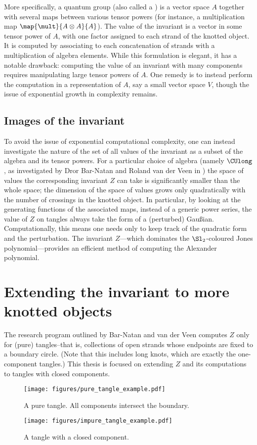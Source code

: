More specifically, a quantum group (also called a ) is a
vector space $A$ together with several maps between various tensor powers (for
instance, a multiplication map $\map {\mult} {A \otimes A} {A}$). The value of
the invariant is a vector in some tensor power of $A$, with one factor assigned
to each strand of the knotted object. It is computed by associating to each
concatenation of strands with a multiplication of algebra elements. While this
formulation is elegant, it has a notable drawback: computing the value of an
invariant with many components requires manipulating large tensor powers of $A$.
One remedy is to instead perform the computation in a representation of $A$, say
a small vector space $V$, though the issue of exponential growth in complexity
remains.

\subsection{Images of the invariant}
To avoid the issue of exponential computational complexity, one can instead
investigate the nature of the set of all values of the invariant as a subset of
the algebra and its tensor powers. For a particular choice of algebra (namely
$\CUlong$, as investigated by Dror Bar-Natan and Roland van der Veen in
\cite{BV}) the space of values the corresponding invariant $Z$ can take is
significantly smaller than the whole space; the dimension of the space of values
grows only quadratically with the number of crossings in the knotted object. In
particular, by looking at the generating functions of the associated maps,
instead of a generic power series, the value of $Z$ on tangles always take the
form of a (perturbed) Gaußian. Computationally, this means one needs only to
keep track of the quadratic form and the perturbation. The invariant $Z$---which
dominates the $\Sl_2$-coloured Jones polynomial---provides an efficient method
of computing the Alexander polynomial.

\section{Extending the invariant to more knotted objects}
The research program outlined by Bar-Natan and van der Veen computes $Z$
only for (pure) tangles--that is, collections of open strands whose endpoints
are fixed to a boundary circle. (Note that this includes long knots, which are
exactly the one-component tangles.) This thesis is focused on extending $Z$ and
its computations to tangles with closed components.
\begin{figure}[h]
        \centering
        \texttt{[image: figures/pure\_tangle\_example.pdf]}
        \caption{A pure tangle. All components intersect the boundary.}
        \label{fig:pure_tangle}
\end{figure}
\begin{figure}[h]
        \centering
        \texttt{[image: figures/impure\_tangle\_example.pdf]}
        \caption{A tangle with a closed component.}
        \label{fig:impure_tangle}
\end{figure}        

